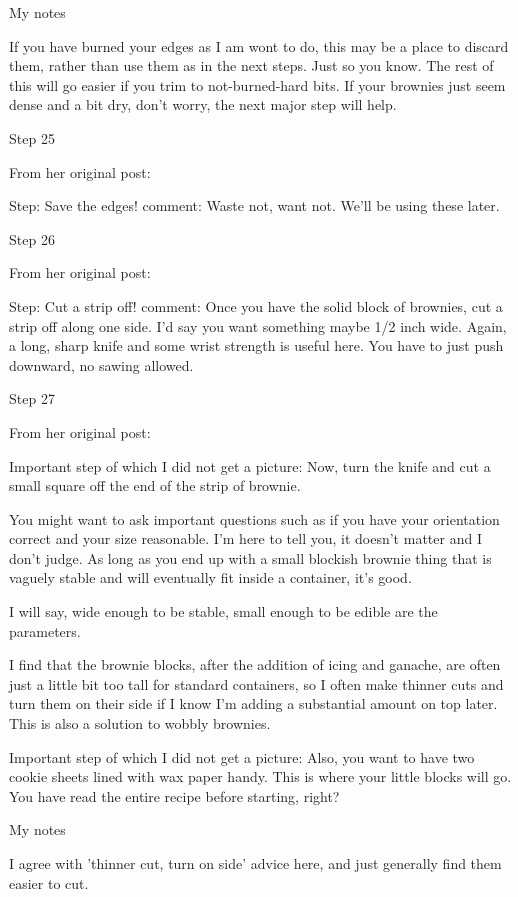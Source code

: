 My notes

If you have burned your edges as I am wont to do, this may be a place to discard them, rather than use them as in the next steps. Just so you know. The rest of this will go easier if you trim to not-burned-hard bits. If your brownies just seem dense and a bit dry, don't worry, the next major step will help.

Step 25

From her original post:

Step: Save the edges!
comment: Waste not, want not. We'll be using these later.

Step 26

From her original post:

Step: Cut a strip off!
comment: Once you have the solid block of brownies, cut a strip off along one side. I'd say you want something maybe 1/2 inch wide. Again, a long, sharp knife and some wrist strength is useful here. You have to just push downward, no sawing allowed.

Step 27

From her original post:

Important step of which I did not get a picture: Now, turn the knife and cut a small square off the end of the strip of brownie.

You might want to ask important questions such as if you have your orientation correct and your size reasonable. I'm here to tell you, it doesn't matter and I don't judge. As long as you end up with a small blockish brownie thing that is vaguely stable and will eventually fit inside a container, it's good.

I will say, wide enough to be stable, small enough to be edible are the parameters.

I find that the brownie blocks, after the addition of icing and ganache, are often just a little bit too tall for standard containers, so I often make thinner cuts and turn them on their side if I know I'm adding a substantial amount on top later. This is also a solution to wobbly brownies.

Important step of which I did not get a picture: Also, you want to have two cookie sheets lined with wax paper handy. This is where your little blocks will go. You have read the entire recipe before starting, right?

My notes

I agree with 'thinner cut, turn on side' advice here, and just generally find them easier to cut.

